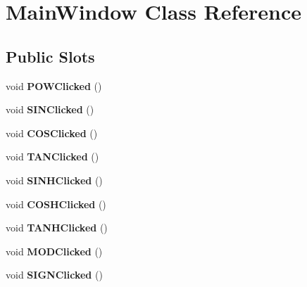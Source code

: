 \hypertarget{class_main_window}{\section{\-Main\-Window \-Class \-Reference}
\label{class_main_window}
}
\subsection*{\-Public \-Slots}
\begin{DoxyCompactItemize}
\item 
\hypertarget{class_main_window_ab623e042d0384fce67ee67b86aa092ab}{void {\bfseries \-P\-O\-W\-Clicked} ()}\label{class_main_window_ab623e042d0384fce67ee67b86aa092ab}

\item 
\hypertarget{class_main_window_a694058b9993bdad7bf4c96b7bae1af37}{void {\bfseries \-S\-I\-N\-Clicked} ()}\label{class_main_window_a694058b9993bdad7bf4c96b7bae1af37}

\item 
\hypertarget{class_main_window_acc7b69effe16bf3936be897b1e9697a2}{void {\bfseries \-C\-O\-S\-Clicked} ()}\label{class_main_window_acc7b69effe16bf3936be897b1e9697a2}

\item 
\hypertarget{class_main_window_abd6beb62d32cc0922fd78819e3c4a9cd}{void {\bfseries \-T\-A\-N\-Clicked} ()}\label{class_main_window_abd6beb62d32cc0922fd78819e3c4a9cd}

\item 
\hypertarget{class_main_window_ae18b7a59154a29d9166dae53a02da0cd}{void {\bfseries \-S\-I\-N\-H\-Clicked} ()}\label{class_main_window_ae18b7a59154a29d9166dae53a02da0cd}

\item 
\hypertarget{class_main_window_ae0cb839c1a84f68cfe7d55d75679bf32}{void {\bfseries \-C\-O\-S\-H\-Clicked} ()}\label{class_main_window_ae0cb839c1a84f68cfe7d55d75679bf32}

\item 
\hypertarget{class_main_window_a9674367d1b35c2b7fcb37547982c7142}{void {\bfseries \-T\-A\-N\-H\-Clicked} ()}\label{class_main_window_a9674367d1b35c2b7fcb37547982c7142}

\item 
\hypertarget{class_main_window_a4edf9a5fcb637c43e2d4d4e107fd0c62}{void {\bfseries \-M\-O\-D\-Clicked} ()}\label{class_main_window_a4edf9a5fcb637c43e2d4d4e107fd0c62}

\item 
\hypertarget{class_main_window_aada810f5e314c0180e159729f1af13f5}{void {\bfseries \-S\-I\-G\-N\-Clicked} ()}\label{class_main_window_aada810f5e314c0180e159729f1af13f5}


\end{DoxyCompactItemize}
